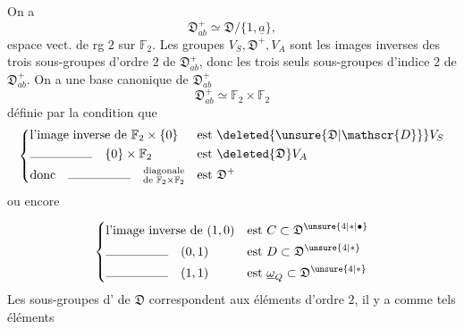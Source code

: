 On a
\[
\mathfrak{D}_{ab}^+\simeq\mathfrak{D}/\{1,\underline a\},
\]
espace vect. de rg $2$ sur $\mathbb{F}_2$. Les groupes $V_S,\mathfrak{D}^+,V_A$ sont les images inverses des trois sous-groupes d'ordre $2$ de $\mathfrak{D}_{ab}^+$, donc les trois seuls sous-groupes d'indice $2$ de $\mathfrak{D}_{ab}^+$. On a une base canonique de $\mathfrak{D}_{ab}^+$
\[
\mathfrak{D}_{ab}^+\simeq\mathbb{F}_2\times\mathbb{F}_2
\]
définie par la condition que
\[
\left\{\begin{aligned}
&\text{l'image inverse de } \mathbb{F}_2\times\{0\} &&\text{est }\deleted{\unsure{\mathfrak{D}|\mathscr{D}}}V_S\\
&\rule{5em}{0.3pt}\quad \{0\}\times\mathbb{F}_2 &&\text{est }\deleted{\mathfrak{D}}V_A\\
&\text{donc}\quad\rule{5em}{0.3pt}\quad\substack{\text{diagonale}\\\text{de }\mathbb{F}_2\times\mathbb{F}_2} &&\text{est }\mathfrak{D}^+
\end{aligned}\right.
\]
ou encore 

\[
\left\{\begin{aligned}
&\text{l'image inverse de }(1,0) &&\text{est }C\subset\mathfrak{D}^{\unsure{4|*|\bullet}}\\
&\rule{5em}{0.3pt}\quad(0,1) &&\text{est }D\subset\mathfrak{D}^{\unsure{4|*}}\\
&\rule{5em}{0.3pt}\quad(1,1) &&\text{est }\underline\omega_Q\subset\mathfrak{D}^{\unsure{4|*}}
\end{aligned}\right.
\]
Les sous-groupes d' de $\mathfrak{D}$ correspondent aux éléments d'ordre $2$, il y a comme tels éléments

